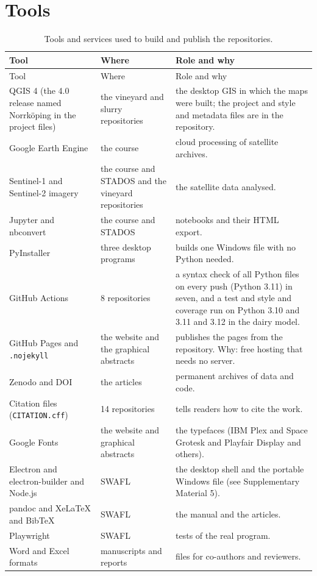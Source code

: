 \documentclass[11pt,a4paper]{article}
\begin{document}
\section{Tools}
\begin{longtable}{@{}R{3.8cm}R{4.8cm}R{6.6cm}@{}}
\caption{Tools and services used to build and publish the repositories.}\label{tab:tools}\\
\toprule Tool & Where & Role and why\\\midrule\endfirsthead
\toprule Tool & Where & Role and why\\\midrule\endhead
QGIS 4 (the 4.0 release named Norrk\"oping in the project files) & the vineyard and slurry repositories & the desktop GIS in which the maps were built; the project and style and metadata files are in the repository.\\
Google Earth Engine & the course & cloud processing of satellite archives.\\
Sentinel-1 and Sentinel-2 imagery & the course and STADOS and the vineyard repositories & the satellite data analysed.\\
Jupyter and nbconvert & the course and STADOS & notebooks and their HTML export.\\
PyInstaller & three desktop programs & builds one Windows file with no Python needed.\\
GitHub Actions & 8 repositories & a syntax check of all Python files on every push (Python 3.11) in seven, and a test and style and coverage run on Python 3.10 and 3.11 and 3.12 in the dairy model.\\
GitHub Pages and \texttt{.nojekyll} & the website and the graphical abstracts & publishes the pages from the repository. Why: free hosting that needs no server.\\
Zenodo and DOI & the articles & permanent archives of data and code.\\
Citation files (\texttt{CITATION.cff}) & 14 repositories & tells readers how to cite the work.\\
Google Fonts & the website and graphical abstracts & the typefaces (IBM Plex and Space Grotesk and Playfair Display and others).\\
Electron and electron-builder and Node.js & SWAFL & the desktop shell and the portable Windows file (see Supplementary Material 5).\\
pandoc and XeLaTeX and BibTeX & SWAFL & the manual and the articles.\\
Playwright & SWAFL & tests of the real program.\\
Word and Excel formats & manuscripts and reports & files for co-authors and reviewers.\\
\bottomrule\end{longtable}
\end{document}
